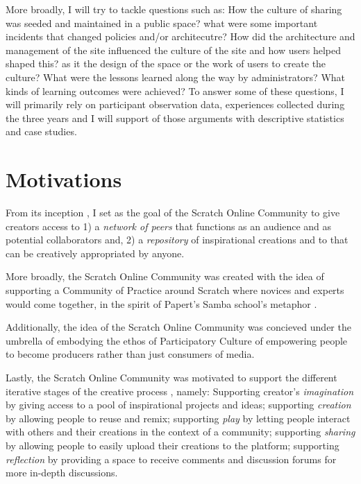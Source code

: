 More broadly, I will try to tackle questions such as: How the culture of sharing was seeded and maintained in a public space? what were some important incidents that changed policies and/or architecutre? How did the architecture and management of the site influenced the culture of the site and how users helped shaped this? 
as it the design of the space or the work of users to create the culture?
 What were the lessons learned along the way by administrators? What kinds of learning outcomes were achieved?
To answer some of these questions, I will primarily rely on participant observation data, experiences collected during the three years and I will support of those arguments with descriptive statistics and case studies.


\section{Motivations}

From its inception \citep{monroy-hernandez_scratchr:_2007,monroy-hernandez_empowering_2008}, I set as the goal of the Scratch Online Community to give creators access to 
1) a \emph{network of peers} that functions as an audience and as potential collaborators and,
2) a \emph{repository} of inspirational creations and to that can be creatively appropriated by anyone.

More broadly, the Scratch Online Community was created with the idea of supporting a Community of Practice around Scratch where novices and experts would come together,  in the spirit of Papert's Samba school's metaphor \citep{papert_mindstorms_1980}.

Additionally, the idea of the Scratch Online Community was concieved under the umbrella of embodying the ethos of Participatory Culture of empowering people to become producers rather than just consumers of media.

Lastly, the Scratch Online Community was motivated to support the different iterative stages of the creative process \citep{resnick_sowing_2008}, namely:
Supporting creator's \emph{imagination} by giving access to a pool of inspirational projects and ideas; supporting \emph{creation} by allowing people to reuse and remix; supporting \emph{play} by letting people interact with others and their creations in the context of a community; supporting \emph{sharing} by allowing people to easily upload their creations to the platform; supporting \emph{reflection} by providing a space to receive comments and discussion forums for more in-depth discussions.

